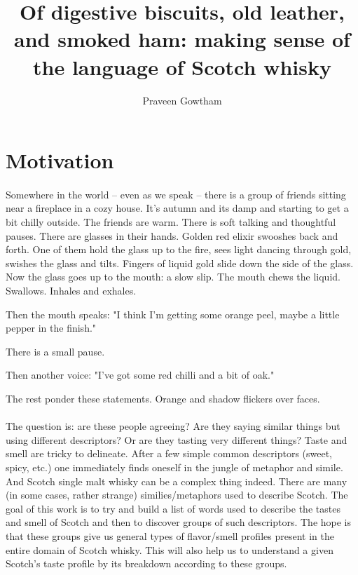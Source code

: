 \documentclass{article}
\begin{document}
	
	\title{Of digestive biscuits, old leather, and smoked ham: making sense of the language of Scotch whisky}
	\author{Praveen Gowtham}
	\date{}
	\maketitle
	
	\section{Motivation}
	\paragraph{} Somewhere in the world -- even as we speak -- there is a group of friends sitting near a fireplace in a cozy house. It's autumn and its damp and starting to get a bit chilly outside. The friends are warm. There is soft talking and thoughtful pauses. There are glasses in their hands. Golden red elixir swooshes back and forth. One of them hold the glass up to the fire, sees light dancing through gold, swishes the glass and tilts. Fingers of liquid gold slide down the side of the glass. Now the glass goes up to the mouth: a slow slip. The mouth chews the liquid. Swallows. Inhales and exhales.
	
	Then the mouth speaks: "I think I'm getting some orange peel, maybe a little pepper in the finish."
	
	There is a small pause. 
	
	Then another voice: "I've got some red chilli and a bit of oak."
	
	The rest ponder these statements. Orange and shadow flickers over faces.
	
	\paragraph{} The question is: are these people agreeing? Are they saying similar things but using different descriptors? Or are they tasting very different things? Taste and smell are tricky to delineate. After a few simple common descriptors (sweet, spicy, etc.) one immediately finds oneself in the jungle of metaphor and simile. And Scotch single malt whisky can be a complex thing indeed. There are many (in some cases, rather strange) similies/metaphors used to describe Scotch. The goal of this work is to try and build a list of words used to describe the tastes and smell of Scotch and then to discover groups of such descriptors. The hope is that these groups give us general types of flavor/smell profiles present in the entire domain of Scotch whisky. This will also help us to understand a given Scotch's taste profile by its breakdown according to these groups.
	
\end{document}

